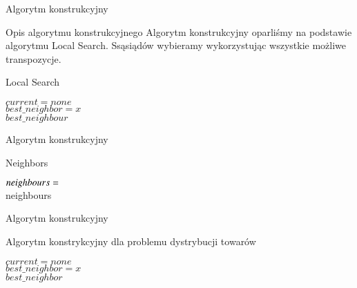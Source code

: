 \begin{frame}{Algorytm konstrukcyjny}
	
	\begin{block}{Opis algorytmu konstrukcyjnego}
		Algorytm konstrukcyjny oparliśmy na podstawie algorytmu Local Search. 
		Ssąsiądów wybieramy wykorzystując wszystkie możliwe transpozycje.
		
	\end{block}

	\begin{block}{Local Search}
		\begin{algorithm}[H]
			
			$current = none$ \\
			$best\_neighbor = x$ \\
			\Return $best\_neighbour$
		\end{algorithm}
	\end{block}

\end{frame}

\begin{frame}{Algorytm konstrukcyjny}

	\begin{block}{Neighbors}
		\begin{algorithm}[H]
			$ neighbours = \empty $ \\
			\Return neighbours
		\end{algorithm}
	\end{block}

\end{frame}

\begin{frame}{Algorytm konstrukcyjny}

	\begin{block}{Algorytm konstrykcyjny dla problemu dystrybucji towarów}

		\begin{algorithm}[H]
			$ current = none $ \\
			$ best\_neighbor = x $ \\
			\Return $best\_neighbor$
		\end{algorithm}
	\end{block}

\end{frame}
